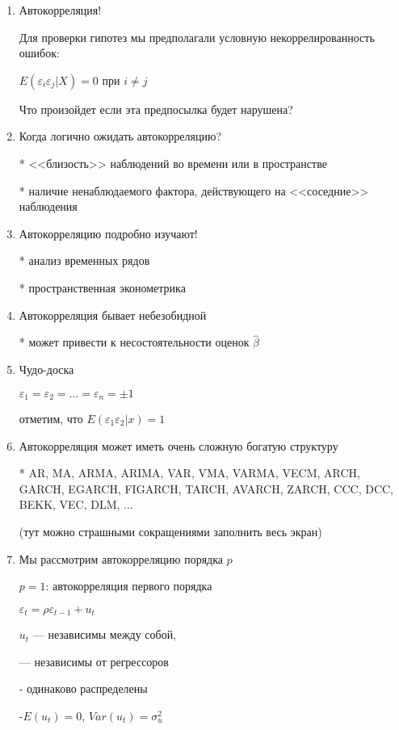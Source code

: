 \documentclass[12pt,a4paper]{article}
\begin{document}
{\Huge

\begin{enumerate}

\item Автокорреляция! 

Для проверки гипотез мы предполагали условную некоррелированность ошибок:

$ E(\varepsilon_i \varepsilon_j | X)=0 $ при $i\neq j$

Что произойдет если эта предпосылка будет нарушена?


\item Когда логично ожидать автокорреляцию?

* <<близость>> наблюдений во времени или в пространстве

* наличие ненаблюдаемого фактора, действующего на <<соседние>> наблюдения

\item Автокорреляцию подробно изучают!

* анализ временных рядов

* пространственная эконометрика

\item Автокорреляция бывает небезобидной

* может привести к несостоятельности оценок $\hat{\beta}$

\item Чудо-доска

$\varepsilon_1=\varepsilon_2=\ldots=\varepsilon_n=\pm 1$

отметим, что $E(\varepsilon_1\varepsilon_2 | x)=1$

\item Автокорреляция может иметь очень сложную богатую структуру

* AR, MA, ARMA, ARIMA, VAR, VMA, VARMA, VECM, ARCH, GARCH, EGARCH, FIGARCH, TARCH, AVARCH, ZARCH, CCC, DCC, BEKK, VEC, DLM, ... 

(тут можно страшными сокращениями заполнить весь экран)

\newpage
\item Мы рассмотрим автокорреляцию порядка $p$

$p=1$: автокорреляция первого порядка

$\varepsilon_{t}=\rho \varepsilon_{t-1}+u_t$

$u_t$ --- независимы между собой, 

--- независимы от регрессоров

- одинаково распределены

-$E(u_t)=0$, $Var(u_t)=\sigma^2_u$



\end{enumerate}}
\end{document}

